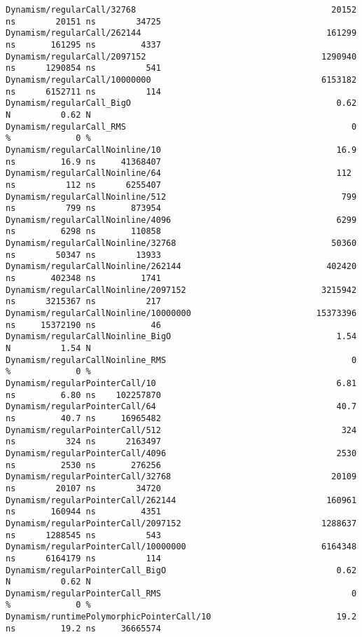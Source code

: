 \begin{code}
\begin{verbatim}
Dynamism/regularCall/32768                                       20152 ns        20151 ns        34725
Dynamism/regularCall/262144                                     161299 ns       161295 ns         4337
Dynamism/regularCall/2097152                                   1290940 ns      1290854 ns          541
Dynamism/regularCall/10000000                                  6153182 ns      6152711 ns          114
Dynamism/regularCall_BigO                                         0.62 N          0.62 N
Dynamism/regularCall_RMS                                             0 %             0 %
Dynamism/regularCallNoinline/10                                   16.9 ns         16.9 ns     41368407
Dynamism/regularCallNoinline/64                                   112 ns          112 ns      6255407
Dynamism/regularCallNoinline/512                                   799 ns          799 ns       873954
Dynamism/regularCallNoinline/4096                                 6299 ns         6298 ns       110858
Dynamism/regularCallNoinline/32768                               50360 ns        50347 ns        13933
Dynamism/regularCallNoinline/262144                             402420 ns       402348 ns         1741
Dynamism/regularCallNoinline/2097152                           3215942 ns      3215367 ns          217
Dynamism/regularCallNoinline/10000000                         15373396 ns     15372190 ns           46
Dynamism/regularCallNoinline_BigO                                 1.54 N          1.54 N
Dynamism/regularCallNoinline_RMS                                     0 %             0 %
Dynamism/regularPointerCall/10                                    6.81 ns         6.80 ns    102257870
Dynamism/regularPointerCall/64                                    40.7 ns         40.7 ns     16965482
Dynamism/regularPointerCall/512                                    324 ns          324 ns      2163497
Dynamism/regularPointerCall/4096                                  2530 ns         2530 ns       276256
Dynamism/regularPointerCall/32768                                20109 ns        20107 ns        34720
Dynamism/regularPointerCall/262144                              160961 ns       160944 ns         4351
Dynamism/regularPointerCall/2097152                            1288637 ns      1288545 ns          543
Dynamism/regularPointerCall/10000000                           6164348 ns      6164179 ns          114
Dynamism/regularPointerCall_BigO                                  0.62 N          0.62 N
Dynamism/regularPointerCall_RMS                                      0 %             0 %
Dynamism/runtimePolymorphicPointerCall/10                         19.2 ns         19.2 ns     36665574

\end{verbatim}
\end{code}

